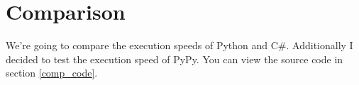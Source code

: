 \section{Comparison}

We're going to compare the execution speeds of Python and C\#. Additionally I decided to test the execution speed of PyPy. You can view the source code in section \ref{comp_code}.



